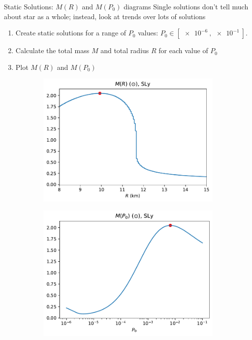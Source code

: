 \documentclass[handout]{beamer}
\begin{document}
    \begin{frame}{Static Solutions: $M(R)$ and $M(P_0)$ diagrams}
        \pause
        Single solutions don't tell much about star as a whole; instead, look at trends over lots of solutions
        \begin{enumerate}
            \item Create static solutions for a range of $P_0$ values: \pause $P_0 \in [\SI{e-6}{}, \SI{e-1}{}].$\pause
            \item Calculate the total mass $M$ and total radius $R$ for each value of $P_0$ \pause
            \item Plot $M(R)$ and $M(P_0)$\pause
        \end{enumerate}

        \begin{figure}[h!]
            \centering
            \begin{subfigure}{.5\textwidth}
                \includegraphics[width = \textwidth]{r_analysis,SLy.pdf}
            \end{subfigure}%
            \begin{subfigure}{.5\textwidth}
                \includegraphics[width = \textwidth]{p0_analysis,SLy.pdf}

\end{subfigure}
\end{figure}
\end{frame}
\end{document}
